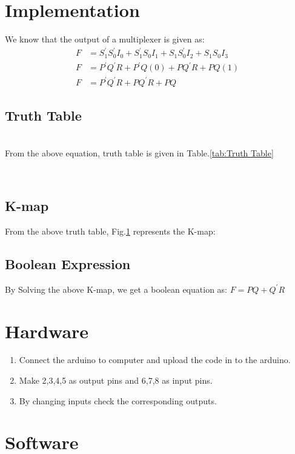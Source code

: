 \documentclass[journal,twocolumn,10pt, a4paper]{article}
\begin{document}
\section{Implementation}
We know that the output of a multiplexer is given as:
\begin{align}
F&=S_1^\prime S_0^\prime I_0+S_1^\prime S_0I_1+S_1S_0^\prime I_2+S_1S_0I_3\\ 
F&=P^\prime Q^\prime{R}+P^\prime Q(0)+PQ^\prime R+PQ(1)\\
F&=P^\prime Q^\prime R+PQ^\prime R+PQ
\end{align}


\subsection{Truth Table}\\
From the above equation, truth table is given in Table.\ref{tab:Truth Table}
\begin{table}[!h]
\centering

\caption{}
\label{tab:Truth Table}
\end{table}\\

\subsection{K-map}
From the above truth table, Fig.\ref{fig:Fig 2} represents the K-map:
\begin{figure}[!h]

\caption{}
\label{fig:Fig 2}
\end{figure}
\subsection{Boolean Expression}
By Solving the above K-map, we get a boolean equation as: $F=PQ+{Q^\prime}R$

\section{Hardware}
\begin{enumerate}
\item Connect the arduino to computer and upload the code in to the arduino.
\item Make 2,3,4,5 as output pins and 6,7,8 as input pins.
\item By changing inputs check the corresponding outputs.
\end{enumerate}

\section{Software}

\end{document}
